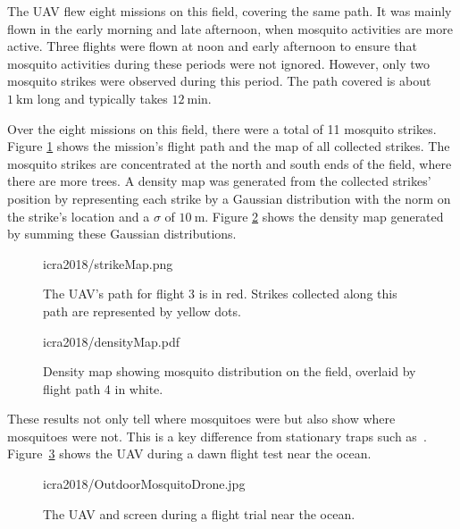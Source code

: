 The UAV flew eight missions on this field, covering the same path.
It was mainly flown in the early morning and late afternoon, when mosquito activities are more active.
Three flights were flown at noon and early afternoon to ensure that mosquito activities during these periods were not ignored.
However, only two mosquito strikes were observed during this period.
The path covered is about $\SI{1}{\kilo\metre}$ long and typically takes $\SI{12}{\minute}$.

Over the eight missions on this field, there were a total of 11 mosquito strikes.
Figure \ref{fig:strikemap} shows the mission's flight path and the map of all collected strikes.
The mosquito strikes are concentrated at the north and south ends of the field, where there are more trees.
A density map was generated from the collected strikes' position by representing each strike by a Gaussian distribution with the norm on the strike's location and a $\sigma$ of $\SI{10}{\metre}$.
Figure \ref{fig:densitymap} shows the density map generated by summing these Gaussian distributions.

\begin{figure}
	\centering
	\begin{overpic}[width=1.0\columnwidth]{icra2018/strikeMap.png}\end{overpic}
	\caption{\label{fig:strikemap}
	The UAV's path for flight 3 is in red. Strikes collected along this path are represented by yellow dots.} 
\end{figure}


\begin{figure}
	\centering
	\begin{overpic}[width=1.0\columnwidth]{icra2018/densityMap.pdf}\end{overpic}
	\caption{\label{fig:densitymap} Density map showing mosquito distribution on the field, overlaid by flight path 4 in white. 
	} \vspace{-2em}
\end{figure}

These results not only tell where mosquitoes were but also show where mosquitoes were not.
This is a key difference from stationary traps such as~\cite{chen2014flying,linn2016building}.
Figure~\ref{fig:DroneAndNetOutside} shows the UAV during a dawn flight test near the ocean.    

\begin{figure}
	\centering
	\begin{overpic}[width=1.0\columnwidth]{icra2018/OutdoorMosquitoDrone.jpg}\end{overpic}
	\caption{\label{fig:DroneAndNetOutside}
	The UAV and screen during a flight trial near the ocean.
	} 
\end{figure}

